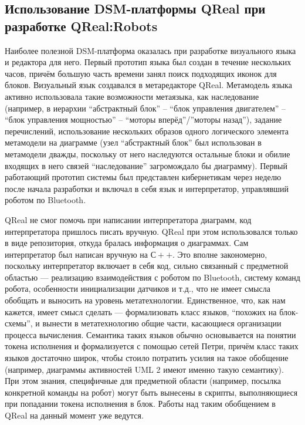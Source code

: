 \documentclass[a4, 12pt]{article}
\begin{document}
\subsection{Использование DSM-платформы QReal при разработке QReal:Robots}

Наиболее полезной DSM-платформа оказалась при разработке визуального языка и редактора для него. Первый прототип языка был создан в течение нескольких часов, причём большую часть времени занял поиск подходящих иконок для блоков. Визуальный язык создавался в метаредакторе QReal. Метамодель языка активно использовала такие возможности метаязыка, как наследование (например, в иерархии “абстрактный блок” -- “блок управления двигателем” -- “блок управления мощностью” -- “моторы вперёд”/”моторы назад”), задание перечислений, использование нескольких образов одного логического элемента метамодели на диаграмме (узел “абстрактный блок” был использован в метамодели дважды, поскольку от него наследуются остальные блоки и обилие входящих в него связей “наследование” загромождало бы диаграмму). Первый работающий прототип системы был представлен кибернетикам через неделю после начала разработки и включал в себя язык и интерпретатор, управлявший роботом по Bluetooth.

QReal не смог помочь при написании интерпретатора диаграмм, код интерпретатора пришлось писать вручную. QReal при этом использовался только в виде репозитория, откуда бралась информация о диаграммах. Сам интерпретатор был написан вручную на $С++$. Это вполне закономерно, поскольку интерпретатор включает в себя код, сильно связанный с предметной областью --- реализацию взаимодействия с роботом по Bluetooth, систему команд робота, особенности инициализации датчиков и т.д., что не имеет смысла обобщать и выносить на уровень метатехнологии. Единственное, что, как нам кажется, имеет смысл сделать --- формализовать класс языков, “похожих на блок-схемы”, и вынести в метатехнологию общие части, касающиеся организации процесса вычисления. Семантика таких языков обычно основывается на понятии токена исполнения и формализуется с помощью сетей Петри, причём класс таких языков достаточно широк, чтобы стоило потратить усилия на такое обобщение (например, диаграммы активностей UML 2 имеют именно такую семантику). При этом 
знания, специфичные для предметной области (например, посылка конкретной команды на робот) могут быть вынесены в скрипты, выполняющиеся при попадании токена исполнения в блок. Работы над таким обобщением в QReal на данный момент уже ведутся.
\end{document}
